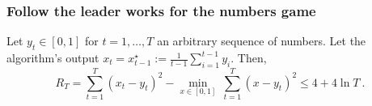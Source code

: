 \documentclass{beamer}
\begin{document}


\begin{frame}
  \frametitle{Follow the leader works for the numbers game}
  \begin{theorem}
    Let $y_t \in [0,1]$ for $t=1,\dots,T$ an arbitrary sequence of numbers. Let the algorithm's output $x_t=x_{t-1}^\star:=\frac{1}{t-1}\sum_{i=1}^{t-1} y_i$. Then,
    \[
      R_T = \sum_{t=1}^T (x_t - y_t)^2 - \min_{x \in [0,1]} \ \sum_{t=1}^T (x - y_t)^2 \leq 4 + 4\ln T~.
    \]
  \end{theorem}

\end{frame}
\end{document}
